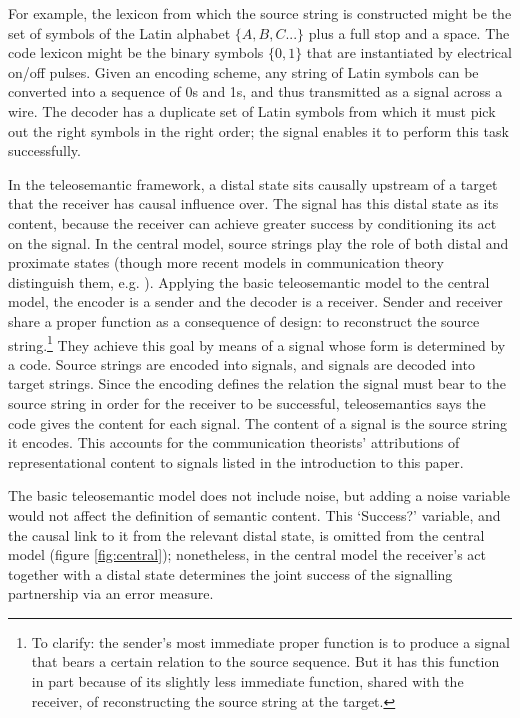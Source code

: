 \documentclass[12pt]{article}
\begin{document}
For example, the lexicon from which the source string is constructed might be the set of symbols of the Latin alphabet $\{A,B,C...\}$ plus a full stop and a space.
The code lexicon might be the binary symbols $\{0,1\}$ that are instantiated by electrical on/off pulses.
Given an encoding scheme, any string of Latin symbols can be converted into a sequence of 0s and 1s, and thus transmitted as a signal across a wire.
The decoder has a duplicate set of Latin symbols from which it must pick out the right symbols in the right order; the signal enables it to perform this task successfully.



In the teleosemantic framework, a distal state sits causally upstream of a target that the receiver has causal influence over.
The signal has this distal state as its content, because the receiver can achieve greater success by conditioning its act on the signal.
In the central model, source strings play the role of both distal and proximate states (though more recent models in communication theory distinguish them, e.g. \citet{berger1996ceo}).
Applying the basic teleosemantic model to the central model, the encoder is a sender and the decoder is a receiver.
Sender and receiver share a proper function as a consequence of design: to reconstruct the source string.\footnote{To clarify: the sender's most immediate proper function is to produce a signal that bears a certain relation to the source sequence. But it has this function in part because of its slightly less immediate function, shared with the receiver, of reconstructing the source string at the target.}
They achieve this goal by means of a signal whose form is determined by a code.
Source strings are encoded into signals, and signals are decoded into target strings.
Since the encoding defines the relation the signal must bear to the source string in order for the receiver to be successful, teleosemantics says the code gives the content for each signal.
The content of a signal is the source string it encodes.
This accounts for the communication theorists' attributions of representational content to signals listed in the introduction to this paper.

The basic teleosemantic model does not include noise, but adding a noise variable would not affect the definition of semantic content.
This `Success?' variable, and the causal link to it from the relevant distal state, is omitted from the central model (figure \ref{fig:central}); nonetheless, in the central model the receiver's act together with a distal state determines the joint success of the signalling partnership via an error measure.
\end{document}
